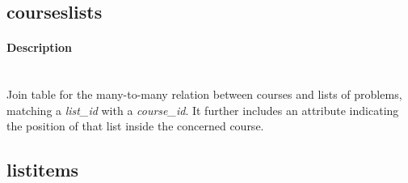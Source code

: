 \subsection{courseslists} %
\begin{figure}
  \vspace{-20pt}
  \begin{center}
  \end{center}
  \vspace{-20pt}
\end{figure}

\paragraph{Description}~\\ %
Join table for the many-to-many relation between courses and lists of problems, matching a \emph{list\_id} with a \emph{course\_id}. It further includes an attribute indicating the position of that list inside the concerned course. 




\subsection{listitems} %
\label{sub:listitems}

\begin{figure}
  \vspace{-20pt}
  \begin{center}
  \end{center}
  \vspace{-20pt}
\end{figure}

